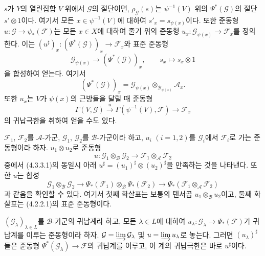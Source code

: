 \begin{env}[4.4.3]
$s$가 $Y$의 열린집합 $V$ 위에서 $\mathcal G$의 절단이면,
$\rho_{\mathcal G}(s)$는 $\psi^{-1}(V)$ 위의 $\Psi^*(\mathcal G)$의
절단 $s'\otimes1$이다. 여기서 모든 $x\in\psi^{-1}(V)$에 대하여
$s'_x=s_{\psi(x)}$이다. 또한 준동형
$u:\mathcal G\to\psi_*(\mathcal F)$는 모든 $x\in X$에 대하여 줄기
위의 준동형 $u_x:\mathcal G_{\psi(x)}\to\mathcal F_x$를 정의한다.
이는 $(u^\sharp)_x:(\Psi^*(\mathcal G))_x\to\mathcal F_x$와 표준
준동형
\[
  \mathcal G_{\psi(x)}\longrightarrow(\Psi^*(\mathcal G))_x,
  \qquad s_x\longmapsto s_x\otimes1
\]
을 합성하여 얻는다. 여기서
\[
  (\Psi^*(\mathcal G))_x
  =\mathcal G_{\psi(x)}
   \otimes_{\mathcal B_{\psi(x)}}\mathcal A_x.
\]
또한 $u_x$는 $V$가 $\psi(x)$의 근방들을 달릴 때 준동형
\[
  \Gamma(V,\mathcal G)\xrightarrow{u}
  \Gamma(\psi^{-1}(V),\mathcal F)\longrightarrow\mathcal F_x
\]
의 귀납극한을 취하여 얻을 수도 있다.
\end{env}

\begin{env}[4.4.4]
\label{0.4.4.4-ko}
$\mathcal F_1$, $\mathcal F_2$를 $\mathcal A$-가군,
$\mathcal G_1$, $\mathcal G_2$를 $\mathcal B$-가군이라 하고,
$u_i$ $(i=1,2)$를 $\mathcal G_i$에서 $\mathcal F_i$로 가는
준동형이라 하자. $u_1\otimes u_2$로 준동형
\[
  u:\mathcal G_1\otimes_{\mathcal B}\mathcal G_2
  \longrightarrow
  \mathcal F_1\otimes_{\mathcal A}\mathcal F_2
\]
중에서 (4.3.3.1)의 동일시 아래
$u^\sharp=(u_1)^\sharp\otimes(u_2)^\sharp$을 만족하는 것을 나타낸다.
또한 $u$는 합성
\[
  \mathcal G_1\otimes_{\mathcal B}\mathcal G_2
  \longrightarrow
  \Psi_*(\mathcal F_1)\otimes_{\mathcal B}\Psi_*(\mathcal F_2)
  \longrightarrow
  \Psi_*(\mathcal F_1\otimes_{\mathcal A}\mathcal F_2)
\]
과 같음을 확인할 수 있다. 여기서 첫째 화살표는 보통의 텐서곱
$u_1\otimes_{\mathcal B}u_2$이고, 둘째 화살표는 (4.2.2.1)의 표준
준동형이다.
\end{env}

\begin{env}[4.4.5]
\label{0.4.4.5-ko}
$(\mathcal G_\lambda)_{\lambda\in L}$를 $\mathcal B$-가군의 귀납계라
하고, 모든 $\lambda\in L$에 대하여
$u_\lambda:\mathcal G_\lambda\to\Psi_*(\mathcal F)$가 귀납계를 이루는
준동형이라 하자. $\mathcal G=\varinjlim\mathcal G_\lambda$ 및
$u=\varinjlim u_\lambda$로 놓는다. 그러면 $(u_\lambda)^\sharp$들은
준동형 $\Psi^*(\mathcal G_\lambda)\to\mathcal F$의 귀납계를 이루고,
이 계의 귀납극한은 바로 $u^\sharp$이다.
\end{env}

